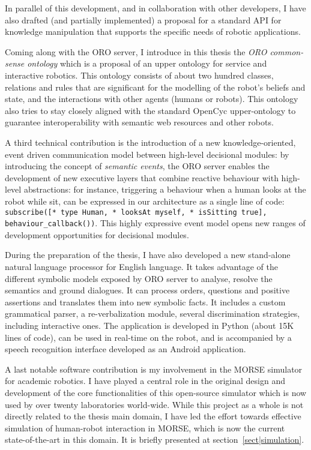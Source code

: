 In parallel of this development, and in collaboration with other developers,
I have also drafted (and partially implemented) a proposal for a standard API
for knowledge manipulation that supports the specific needs of robotic
applications.

Coming along with the ORO server, I introduce in this thesis the
\emph{ORO common-sense ontology} which is a proposal of an upper ontology for
service and interactive robotics. This ontology consists of about two hundred
classes, relations and rules that are significant for the modelling of the
robot's beliefs and state, and the interactions with other agents (humans or
robots). This ontology also tries to stay closely aligned with the standard
{\sc OpenCyc} upper-ontology to guarantee interoperability with semantic
web resources and other robots.

A third technical contribution is the introduction of a new
knowledge-oriented, event driven communication model between high-level
decisional modules: by introducing the concept of \emph{semantic events}, the ORO
server enables the development of new executive layers that combine reactive
behaviour with high-level abstractions: for instance, triggering a behaviour
when a human looks at the robot while sit, can be expressed in our architecture
as a single line of code: {\tt subscribe([* type Human, * looksAt myself, *
isSitting true], behaviour\_callback())}. This highly expressive event model
opens new ranges of development opportunities for decisional modules.

During the preparation of the thesis, I have also developed a new stand-alone
natural language processor for English language. It takes advantage of the
different symbolic models exposed by ORO server to analyse, resolve the
semantics and ground dialogues. It can process orders, questions and positive
assertions and translates them into new symbolic facts. It includes a custom
grammatical parser, a re-verbalization module, several discrimination
strategies, including interactive ones. The application is developed in Python
(about 15K lines of code), can be used in real-time on the robot, and is
accompanied by a speech recognition interface developed as an Android
application.

A last notable software contribution is my involvement in the MORSE simulator
for academic robotics. I have played a central role in the original design and
development of the core functionalities of this open-source simulator which is
now used by over twenty laboratories world-wide. While this project as a whole
is not directly related to the thesis main domain, I have led the effort towards
effective simulation of human-robot interaction in MORSE, which is now the
current state-of-the-art in this domain. It is briefly presented at
section~\ref{sect|simulation}.


